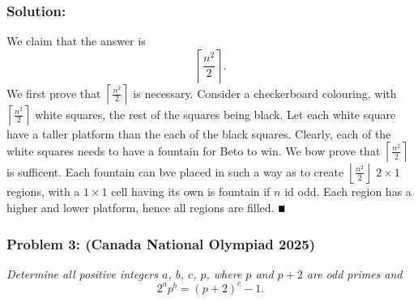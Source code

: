 \documentclass[fontsize=10pt]{article}
\begin{document}
\subsubsection*{Solution:}
We claim that the answer is \[ \left \lceil  \frac{n^2}{2} \right \rceil. \] We first prove that 
$\left \lceil  \frac{n^2}{2} \right \rceil$ is necessary. Consider a checkerboard colouring,
with $\left \lceil  \frac{n^2}{2} \right \rceil$ white squares, the rest of the squares being black. Let each white square 
have a taller platform than the each of the black squares. Clearly, each of the white squares needs to have a 
fountain for Beto to win. \newline
We bow prove that $\left \lceil  \frac{n^2}{2} \right \rceil$ is sufficent. Each fountain can bve placed in such a way 
as to create $\left \lfloor  \frac{n^2}{2} \right \rfloor$ $2 \times 1$ regions, with a $1\times 1$ cell having its own
is fountain if $n$ id odd. Each region has a higher and lower platform, hence all regions are filled. $\hfill \blacksquare$


\subsubsection*{Problem 3: (Canada National Olympiad 2025)}
	\textit{Determine all positive integers $a$, $b$, $c$, $p$, where $p$ and $p+2$ are odd primes and
    \[2^ap^b=(p+2)^c-1.\] }
\end{document}
